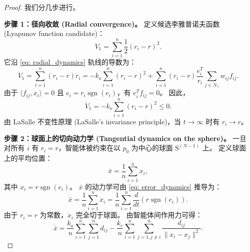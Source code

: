\documentclass{ctexart}
\DeclareMathOperator{\sgn}{sgn}
\begin{document}
\begin{proof}
我们分几步进行。

\textbf{步骤 1：径向收敛 (Radial convergence)。}
定义候选李雅普诺夫函数 (Lyapunov function candidate)：
\begin{equation}
V_1 = \sum_{i=1}^{n} \frac{1}{2}(r_i - r)^2.
\end{equation}
它沿 \eqref{eq: radial_dynamics} 轨线的导数为：
\begin{equation}
\dot{V}_1 = \sum_{i=1}^{n} (r_i - r)\dot{r}_i = -k_o \sum_{i=1}^{n} (r_i - r)^2 + \sum_{i=1}^{n} (r_i - r) \frac{e_i^T}{r_i} \sum_{j \in \mathcal{N}_i} w_{ij} f_{ij}.
\end{equation}
由于 $\langle f_{ij}, x_i \rangle = 0$ 且 $e_i = r_i \sgn(e_i)$，有 $e_i^T f_{ij} = 0$。
因此，
\begin{equation}
\dot{V}_1 = -k_o \sum_{i=1}^{n} (r_i - r)^2 \leq 0.
\end{equation}
由 LaSalle 不变性原理 (LaSalle's invariance principle)，当 $t \to \infty$ 时有 $r_i \to r$。

\textbf{步骤 2：球面上的切向动力学 (Tangential dynamics on the sphere)。}
一旦对所有 $i$ 有 $r_i = r$，智能体被约束在以 $p_0$ 为中心的球面 $\mathrm{S}^{(N-1)}$ 上。
定义球面上的平均位置：
\begin{equation}
\bar{x} = \frac{1}{n} \sum_{i=1}^{n} x_i,
\end{equation}
其中 $x_i = r \sgn(e_i)$。
$\bar{x}$ 的动力学可由 \eqref{eq: error_dynamics} 推导为：
\begin{equation}
\dot{\bar{x}} = \frac{1}{n} \sum_{i=1}^{n} \dot{x}_i = \frac{1}{n} \sum_{i=1}^{n} \frac{d}{dt}(r \sgn(e_i)).
\end{equation}
由于 $r_i = r$ 为常数，$\dot{x}_i$ 完全切于球面。
由智能体间作用力可得：
\begin{equation}
\dot{\bar{x}} = \frac{k_a}{n} \sum_{i=1}^{n} \sum_{j=1}^{n} d_{ij} - \frac{k_r}{n} \sum_{i=1}^{n} \sum_{j=1, j \neq i}^{n} \frac{d_{ij}}{\|x_i - x_j\|^2}.
\label{eq: average_dynamics}
\end{equation}


\end{proof}
\end{document}
